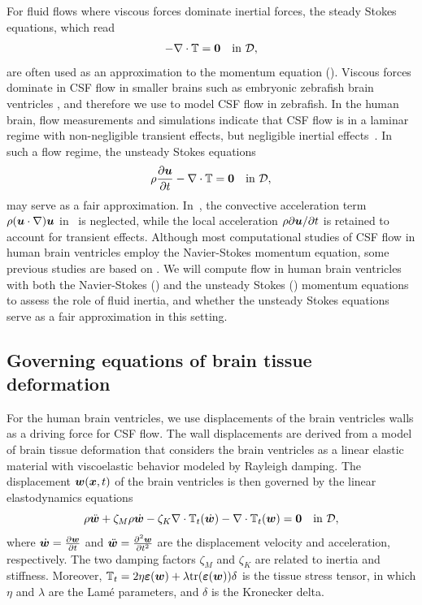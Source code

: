 \documentclass{template}
\begin{document}
For fluid flows where viscous forces dominate inertial 
forces, the steady Stokes equations, which read
\begin{equation}
    - \nabla\cdot\mathbb{T} = \bm{0} \quad\text{in }\mathcal{D},
    \label{eq:stokes_eq}
\end{equation}
are often used as an approximation to the momentum equation
().
Viscous forces dominate in CSF flow in smaller brains
such as embryonic zebrafish brain ventricles
\citep{Olstad2019CiliaryDevelopment, Herlyng2025AdvectionDiffusion},
and therefore we use  to model CSF flow
in zebrafish. In the human brain, flow measurements and simulations
indicate that CSF flow is in a laminar regime
with non-negligible transient effects, but negligible
inertial effects~\citep{Gholampour2018FSI, howden2008three}.
In such a flow regime, the unsteady Stokes equations
\begin{equation}
    \rho\frac{\partial \bm{u}}{\partial t} - \nabla\cdot\mathbb{T} = \bm{0} \quad\text{in }\mathcal{D},
    \label{eq:unsteady_stokes_eq}
\end{equation}
may serve as a fair approximation.
In~, the convective acceleration term
$\rho (\bm{u}\cdot\nabla)\bm{u}$ in~ is neglected,
while the local acceleration
$\rho\partial\bm{u}/\partial t$ is retained to account for transient effects.
Although most computational studies of CSF flow in human brain ventricles
employ the Navier-Stokes momentum equation, some previous
studies are based on 
\citep{Causemann2022HumanFramework, kelley2023cerebrospinal}.
We will compute flow in human brain ventricles with both the
Navier-Stokes () and the unsteady
Stokes () momentum equations to assess
the role of fluid inertia, and whether the unsteady Stokes equations
serve as a fair approximation in this setting.

\subsection{Governing equations of brain tissue deformation}
For the human brain ventricles, we use displacements of the brain
ventricles walls as a driving force for CSF flow. The wall displacements are 
derived from a model of brain tissue deformation that considers the brain
ventricles as a linear elastic material with viscoelastic
behavior modeled by Rayleigh damping. The displacement $\bm{w}(\bm{x}, t)$
of the brain ventricles is then governed by the linear elastodynamics
equations
\begin{equation}
    \rho\ddot{\bm{w}} + \zeta_M\rho\dot{\bm{w}} - \zeta_K\nabla\cdot\mathbb{T}_t(\dot{\bm{w}})
    - \nabla\cdot\mathbb{T}_t(\bm{w}) = \bm{0} \quad\text{in }\mathcal{D},
    \label{eq:strong_linear_elasticity_1}
\end{equation}
where $\dot{\bm{w}} = \frac{\partial \bm{w}}{\partial t}$ and $\ddot{\bm{w}} = \frac{\partial^2 \bm{w}}{\partial t^2}$
are the displacement velocity and acceleration, respectively.
The two damping factors $\zeta_M$ and $\zeta_K$
are related to inertia and stiffness. 
Moreover, $\mathbb{T}_t = 2\eta\bm{\varepsilon}(\bm{w}) + \lambda\mathrm{tr}(\bm{\varepsilon}(\bm{w}))\delta$ is the
tissue stress tensor, in which $\eta$ and $\lambda$ are the Lamé parameters,
and $\delta$ is the Kronecker delta. 
\end{document}
